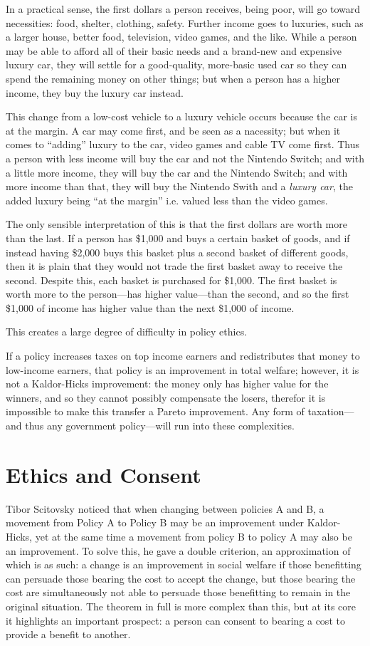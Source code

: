 In a practical sense, the first dollars a person receives, being poor, will go toward necessities:  food, shelter, clothing, safety.  Further income goes to luxuries, such as a larger house, better food, television, video games, and the like.  While a person may be able to afford all of their basic needs and a brand-new and expensive luxury car, they will settle for a good-quality, more-basic used car so they can spend the remaining money on other things; but when a person has a higher income, they buy the luxury car instead.

This change from a low-cost vehicle to a luxury vehicle occurs because the car is at the margin.  A car may come first, and be seen as a nacessity; but when it comes to ``adding'' luxury to the car, video games and cable TV come first.  Thus a person with less income will buy the car and not the Nintendo Switch; and with a little more income, they will buy the car and the Nintendo Switch; and with more income than that, they will buy the Nintendo Swith and a \textit{luxury car}, the added luxury being ``at the margin'' i.e. valued less than the video games.

The only sensible interpretation of this is that the first dollars are worth more than the last.  If a person has \$1,000 and buys a certain basket of goods, and if instead having \$2,000 buys this basket plus a second basket of different goods, then it is plain that they would not trade the first basket away to receive the second.  Despite this, each basket is purchased for \$1,000.  The first basket is worth more to the person—has higher value—than the second, and so the first \$1,000 of income has higher value than the next \$1,000 of income.

This creates a large degree of difficulty in policy ethics.

If a policy increases taxes on top income earners and redistributes that money to low-income earners, that policy is an improvement in total welfare; however, it is not a Kaldor-Hicks improvement:  the money only has higher value for the winners, and so they cannot possibly compensate the losers, therefor it is impossible to make this transfer a Pareto improvement.  Any form of taxation—and thus any government policy—will run into these complexities.

\section{Ethics and Consent}

Tibor Scitovsky noticed that when changing between policies A and B, a movement from Policy A to Policy B may be an improvement under Kaldor-Hicks, yet at the same time a movement from policy B to policy A may also be an improvement.  To solve this, he gave a double criterion, an approximation of which is as such:  a change is an improvement in social welfare if those benefitting can persuade those bearing the cost to accept the change, but those bearing the cost are simultaneously not able to persuade those benefitting to remain in the original situation.  The theorem in full is more complex than this, but at its core it highlights an important prospect:  a person can consent to bearing a cost to provide a benefit to another.

